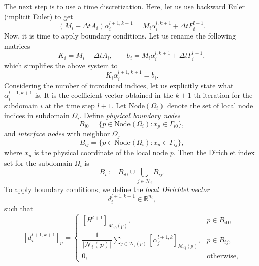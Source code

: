 \documentclass[a4paper, 11pt]{article}
\theoremstyle{plain}
\theoremstyle{definition}
\theoremstyle{remark}
\begin{document}
The next step is to use a time discretization. Here, let us use backward Euler (implicit Euler) to get
\begin{equation*}
    \left(M_{i} + \Delta t A_{i}\right)\alpha_{i}^{l+1, k+1} = M_{i} \alpha_{i}^{l, k+1} + \Delta tF_{i}^{l+1}.
\end{equation*}
Now, it is time to apply boundary conditions. Let us rename the following matrices
\begin{equation*}
    K_{i} = M_{i} + \Delta t A_{i}, \qquad b_{i} = M_{i} \alpha_{i}^{l, k+1} + \Delta tF_{i}^{l+1}, 
\end{equation*}
which simplifies the above system to
\begin{equation*}
    K_{i}\alpha_{i}^{l+1, k+1} = b_{i}.
\end{equation*}
Considering the number of introduced indices, let us explicitly state what $\alpha_{i}^{l+1, k+1}$ is. It is the coefficient vector obtained in the $k+1$-th iteration for the subdomain $i$ at the time step $l+1$. Let $\text{Node}(\Omega_{i})$ denote the set of local node indices in subdomain $\Omega_{i}$. Define \textit{physical boundary nodes}
\begin{equation*}
    B_{i0} = \{p\in \text{Node}(\Omega_{i}): x_{p}\in \Gamma_{i0}\},
\end{equation*}
and \textit{interface nodes} with neighbor $\Omega_{j}$
\begin{equation*}
    B_{ij} = \{p\in \text{Node}(\Omega_{i}): x_{p}\in \Gamma_{ij}\},
\end{equation*}
where $x_p$ is the physical coordinate of the local node $p$. Then the Dirichlet index set for the subdomain $\Omega_{i}$ is
\begin{equation*}
    B_{i} := B_{i0} \cup \bigcup_{j\in\mathcal N_i} B_{ij}.
\end{equation*}
To apply boundary conditions, we define the \textit{local Dirichlet vector} 
\begin{equation*}
    d^{l+1, k+1}_{i} \in \mathbb{R}^{n_{i}},
\end{equation*}
such that
\begin{equation*}
    \left[d^{l+1, k+1}_{i}\right]_{p} = 
    \begin{cases}
        \left[H^{l+1}\right]_{\mathcal{M}_{i0}(p)}, & p\in B_{i0},\\[3pt]
        \dfrac{1}{\lvert \mathcal{N}_{i}(p)\rvert}\sum\limits_{j\in\mathcal{N}_{i}(p)}\left[\alpha^{l+1, k}_{j}\right]_{\mathcal{M}_{ij}(p)}, & p\in B_{ij},\\
        0, & \text{otherwise},
    \end{cases}
\end{equation*}
\end{document}
